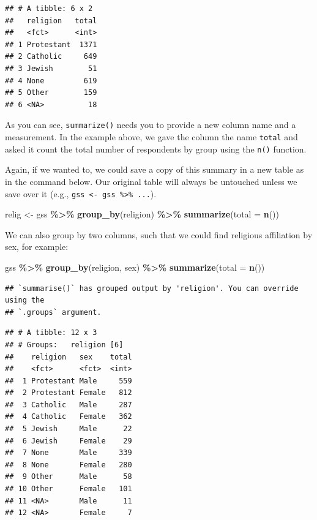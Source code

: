 \documentclass[
]{book}
\newenvironment{Shaded}{\begin{snugshade}}{\end{snugshade}}
\newcommand{\AttributeTok}[1]{\textcolor[rgb]{0.13,0.29,0.53}{#1}}
\newcommand{\FunctionTok}[1]{\textcolor[rgb]{0.13,0.29,0.53}{\textbf{#1}}}
\newcommand{\NormalTok}[1]{#1}
\newcommand{\OtherTok}[1]{\textcolor[rgb]{0.56,0.35,0.01}{#1}}
\newcommand{\SpecialCharTok}[1]{\textcolor[rgb]{0.81,0.36,0.00}{\textbf{#1}}}
\begin{document}
\begin{verbatim}
## # A tibble: 6 x 2
##   religion   total
##   <fct>      <int>
## 1 Protestant  1371
## 2 Catholic     649
## 3 Jewish        51
## 4 None         619
## 5 Other        159
## 6 <NA>          18
\end{verbatim}

As you can see, \texttt{summarize()} needs you to provide a new column name and a measurement. In the example above, we gave the column the name \texttt{total} and asked it count the total number of respondents by group using the \texttt{n()} function.

Again, if we wanted to, we could save a copy of this summary in a new table as in the command below. Our original table will always be untouched unless we save over it (e.g., \texttt{gss\ \textless{}-\ gss\ \%\textgreater{}\%\ ...}).

\begin{Shaded}
\begin{Highlighting}[]
\NormalTok{relig }\OtherTok{\textless{}{-}}\NormalTok{ gss }\SpecialCharTok{\%\textgreater{}\%}
  \FunctionTok{group\_by}\NormalTok{(religion) }\SpecialCharTok{\%\textgreater{}\%}
  \FunctionTok{summarize}\NormalTok{(}\AttributeTok{total =} \FunctionTok{n}\NormalTok{())}
\end{Highlighting}
\end{Shaded}

We can also group by two columns, such that we could find religious affiliation by sex, for example:

\begin{Shaded}
\begin{Highlighting}[]
\NormalTok{gss }\SpecialCharTok{\%\textgreater{}\%}
  \FunctionTok{group\_by}\NormalTok{(religion, sex) }\SpecialCharTok{\%\textgreater{}\%}
  \FunctionTok{summarize}\NormalTok{(}\AttributeTok{total =} \FunctionTok{n}\NormalTok{())}
\end{Highlighting}
\end{Shaded}

\begin{verbatim}
## `summarise()` has grouped output by 'religion'. You can override using the
## `.groups` argument.
\end{verbatim}

\begin{verbatim}
## # A tibble: 12 x 3
## # Groups:   religion [6]
##    religion   sex    total
##    <fct>      <fct>  <int>
##  1 Protestant Male     559
##  2 Protestant Female   812
##  3 Catholic   Male     287
##  4 Catholic   Female   362
##  5 Jewish     Male      22
##  6 Jewish     Female    29
##  7 None       Male     339
##  8 None       Female   280
##  9 Other      Male      58
## 10 Other      Female   101
## 11 <NA>       Male      11
## 12 <NA>       Female     7
\end{verbatim}
\end{document}
